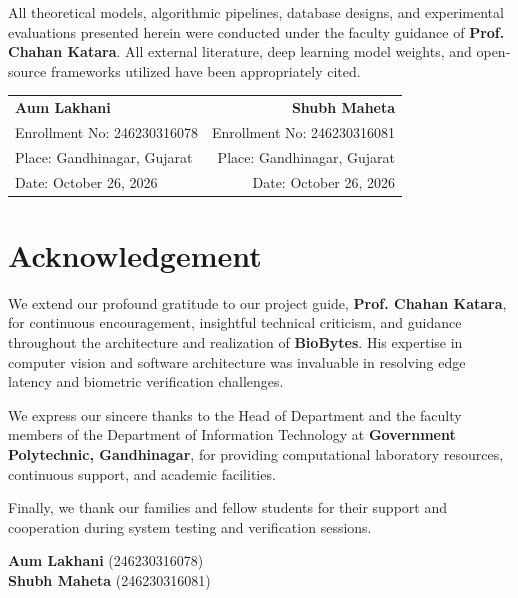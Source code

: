 \documentclass[12pt,a4paper,oneside]{report}
\begin{document}
\vspace{0.5cm}
\noindent All theoretical models, algorithmic pipelines, database designs, and experimental evaluations presented herein were conducted under the faculty guidance of \textbf{Prof. Chahan Katara}. All external literature, deep learning model weights, and open-source frameworks utilized have been appropriately cited.

\vspace{2.5cm}

\noindent
\begin{tabularx}{\textwidth}{X r}
\textbf{Aum Lakhani} & \textbf{Shubh Maheta} \\
Enrollment No: 246230316078 & Enrollment No: 246230316081 \\
Place: Gandhinagar, Gujarat & Place: Gandhinagar, Gujarat \\
Date: October 26, 2026 & Date: October 26, 2026 \\
\end{tabularx}

\clearpage

\chapter*{Acknowledgement}

\noindent We extend our profound gratitude to our project guide, \textbf{Prof. Chahan Katara}, for continuous encouragement, insightful technical criticism, and guidance throughout the architecture and realization of \textbf{BioBytes}. His expertise in computer vision and software architecture was invaluable in resolving edge latency and biometric verification challenges.

\vspace{0.5cm}
\noindent We express our sincere thanks to the Head of Department and the faculty members of the Department of Information Technology at \textbf{Government Polytechnic, Gandhinagar}, for providing computational laboratory resources, continuous support, and academic facilities.

\vspace{0.5cm}
\noindent Finally, we thank our families and fellow students for their support and cooperation during system testing and verification sessions.

\vspace{1.5cm}
\begin{flushright}
    \textbf{Aum Lakhani} (246230316078) \\
    \textbf{Shubh Maheta} (246230316081)
\end{flushright}
\end{document}
